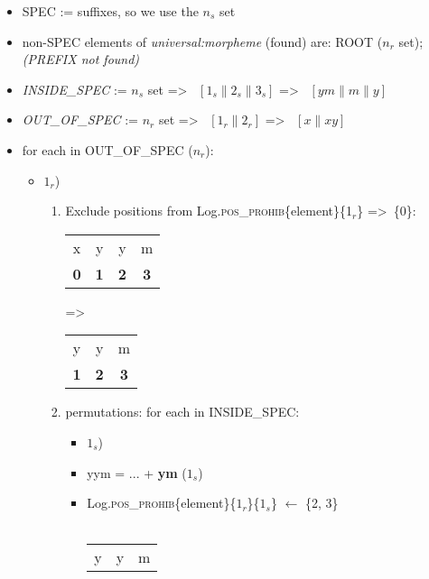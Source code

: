 \documentclass{article}
\begin{document}
\begin{itemize}
    \item SPEC := suffixes, so we use the $n_s$ set
    \item non-SPEC elements of \textit{universal:morpheme} (found) are: ROOT ($n_r$ set); \textit{(PREFIX not found)}
    \item \textit{INSIDE\_SPEC} := $n_s$ set =\textgreater ~ $[ 1_s \| 2_s \| 3_s ]$ =\textgreater ~ $[ \textit{ym} \| \textit{m} \| \textit{y} ]$ 
    \item \textit{OUT\_OF\_SPEC} := $n_r$ set =\textgreater ~ $[ 1_r \| 2_r ]$ =\textgreater ~ $[ \textit{x} \| \textit{xy} ]$
    \item for each in OUT\_OF\_SPEC ($n_r$):
    \begin{itemize}
        \item $1_r$)
        \begin{enumerate}
            \item Exclude positions from Log.\textsc{pos\_prohib}\{element\}\{\textsc{1$_{r}$}\} =\textgreater ~\{0\}:
            \\
            \begin{tabular}{ |c|c|c|c| } 
             \hline
             x & y & y & m \\ 
             \textbf{0} & \textbf{1} & \textbf{2} & \textbf{3} \\ 
             \hline
            \end{tabular}
            =\textgreater~
            \begin{tabular}{ |c|c|c| } 
             \hline
             y & y & m \\ 
             \textbf{1} & \textbf{2} & \textbf{3} \\ 
             \hline
            \end{tabular}
            \item permutations: for each in INSIDE\_SPEC:
            \begin{itemize}
                \item $1_s$)
                \item yym = ... + \textbf{ym} ($1_s$)
                \item  Log.\textsc{pos\_prohib}\{element\}\{\textsc{$1_r$}\}\{\textsc{$1_s$}\} $\leftarrow$ \{2, 3\}
                \\ ~~~
                \begin{tabular}{ |c|c|c| } 
                 \hline
                 y & y & m \\ 

\end{tabular}
\end{itemize}
\end{enumerate}
\end{itemize}
\end{itemize}
\end{document}
